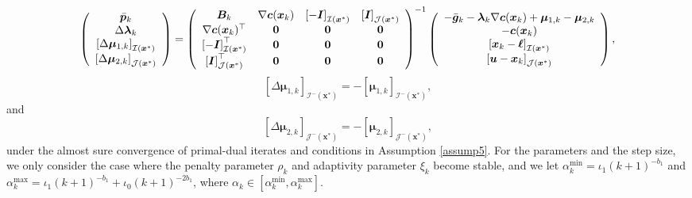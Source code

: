 \documentclass[aos]{imsart}
\numberwithin{equation}{section}
\theoremstyle{plain}
\begin{document}
   \begin{equation}
\label{eq29}
    \left( \begin{array}{c}
        \Bar{\bm{p}}_k \\
        \Delta \bm{\lambda}_{k}\\
        \left[\Delta \bm{\mu}_{1,k} \right]_{\mathcal{I}(\bm{x}^{*})} \\
        \left[\Delta \bm{\mu}_{2,k} \right]_{\mathcal{J}(\bm{x}^{*})}
    \end{array} \right) =  \left( \begin{array}{cccc}
           \bm{B}_k & \nabla \bm{c}(\bm{x}_k) & \left[-\bm{I}\right]_{\mathcal{I}(\bm{x}^{*})} & \left[\bm{I}\right]_{\mathcal{J}(\bm{x}^{*})}\\
           \nabla \bm{c}(\bm{x}_k)^{\top} & \bm{0} & \bm{0} & \bm{0}\\
           \left[-\bm{I}\right]_{\mathcal{I}(\bm{x}^{*})}^{\top} & \bm{0} & \bm{0} & \bm{0} \\
           \left[\bm{I}\right]_{\mathcal{J}(\bm{x}^{*})}^{\top} & \bm{0} & \bm{0} & \bm{0}
       \end{array} \right)^{-1} \left( \begin{array}{c}
        - \Bar{\bm{g}}_k - \bm{\lambda}_{k} \nabla \bm{c}(\bm{x}_k)  + \bm{\mu}_{1,k} - \bm{\mu}_{2,k}\\
        -\bm{c}(\bm{x}_k)\\
        \left[\bm{x}_k - \bm{\ell}\right]_{\mathcal{I}(\bm{x}^{*})}\\
        \left[\bm{u} - \bm{x}_{k}\right]_{\mathcal{J}(\bm{x}^{*})}
       \end{array} \right),
\end{equation}
\begin{equation*}
    \left[\Delta \bm{\mu}_{1,k} \right]_{\mathcal{I}^{-}(\bm{x}^{*})} = - \left[ \bm{\mu}_{1,k} \right]_{\mathcal{I}^{-}(\bm{x}^{*})},
\end{equation*}
and
\begin{equation*}
    \left[\Delta \bm{\mu}_{2,k} \right]_{\mathcal{J}^{-}(\bm{x}^{*})} = - \left[ \bm{\mu}_{2,k} \right]_{\mathcal{J}^{-}(\bm{x}^{*})},
\end{equation*}
under the almost sure convergence of primal-dual iterates and conditions in Assumption \ref{assump5}.
For the parameters and the step size, we only consider the case where the penalty parameter $\rho_k$ and adaptivity parameter $\xi_k$ become stable, and we let $\alpha_{k}^{\text{min}} = \iota_1 (k+1)^{-b_1}$ and $\alpha_{k}^{\text{max}} = \iota_1 (k+1)^{-b_1} + \iota_0 (k+1)^{-2b_1}$, where $\alpha_k \in [\alpha_{k}^{\text{min}}, \alpha_{k}^{\text{max}}]$. 
\end{document}
